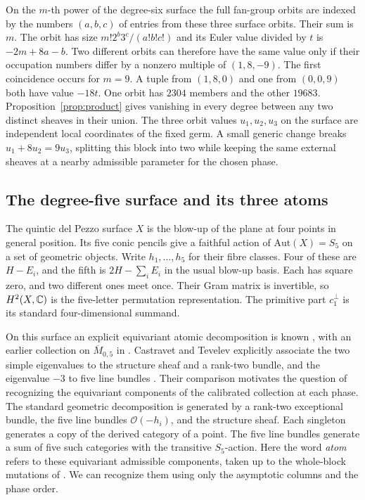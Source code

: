 On the $m$-th power of the degree-six surface the full fan-group orbits are indexed by the numbers $(a,b,c)$ of entries from these three surface orbits. Their sum is $m$. The orbit has size $m!2^b3^c/(a!b!c!)$ and its Euler value divided by $t$ is $-2m+8a-b$. Two different orbits can therefore have the same value only if their occupation numbers differ by a nonzero multiple of $(1,8,-9)$. The first coincidence occurs for $m=9$. A tuple from $(1,8,0)$ and one from $(0,0,9)$ both have value $-18t$. One orbit has $2304$ members and the other $19683$. Proposition~\ref{prop:product} gives vanishing in every degree between any two distinct sheaves in their union. The three orbit values $u_1,u_2,u_3$ on the surface are independent local coordinates of the fixed germ. A small generic change breaks $u_1+8u_2=9u_3$, splitting this block into two while keeping the same external sheaves at a nearby admissible parameter for the chosen phase.

\subsection{The degree-five surface and its three atoms}\label{sec:quintic}
The quintic del Pezzo surface $X$ is the blow-up of the plane at four points in general position. Its five conic pencils give a faithful action of $\mathrm{Aut}(X)=S_5$ on a set of geometric objects. Write $h_1,\ldots,h_5$ for their fibre classes. Four of these are $H-E_i$, and the fifth is $2H-\sum_i E_i$ in the usual blow-up basis. Each has square zero, and two different ones meet once. Their Gram matrix is invertible, so $H^2(X,\mathbb C)$ is the five-letter permutation representation. The primitive part $c_1^\perp$ is its standard four-dimensional summand.

On this surface an explicit equivariant atomic decomposition is known \cite[Lemma~3.15 and Proposition~5.3]{ESS}, with an earlier collection on $\overline M_{0,5}$ in \cite[Example~1.3]{CT}. Castravet and Tevelev explicitly associate the two simple eigenvalues to the structure sheaf and a rank-two bundle, and the eigenvalue $-3$ to five line bundles \cite[Introduction]{CT}. Their comparison motivates the question of recognizing the equivariant components of the calibrated collection at each phase. The standard geometric decomposition is generated by a rank-two exceptional bundle, the five line bundles $\mathcal O(-h_i)$, and the structure sheaf. Each singleton generates a copy of the derived category of a point. The five line bundles generate a sum of five such categories with the transitive $S_5$-action. Here the word \emph{atom} refers to these equivariant admissible components, taken up to the whole-block mutations of \cite{ESS}. We can recognize them using only the asymptotic columns and the phase order.

